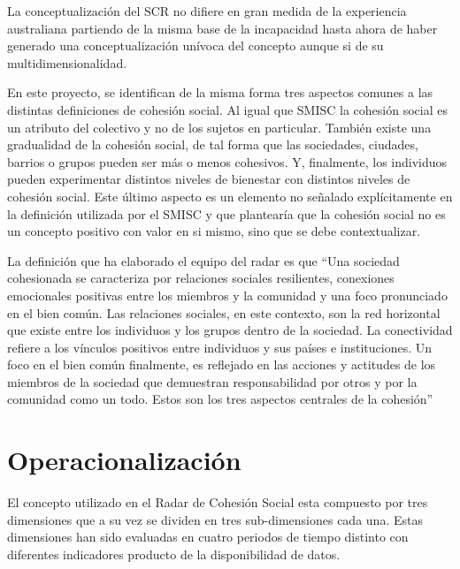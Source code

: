 \documentclass[
  12pt,
]{book}
\begin{document}
La conceptualización del SCR no difiere en gran medida de la experiencia
australiana partiendo de la misma base de la incapacidad hasta ahora de
haber generado una conceptualización unívoca del concepto aunque si de
su multidimensionalidad.

En este proyecto, se identifican de la misma forma tres aspectos comunes
a las distintas definiciones de cohesión social. Al igual que SMISC la
cohesión social es un atributo del colectivo y no de los sujetos en
particular. También existe una gradualidad de la cohesión social, de tal
forma que las sociedades, ciudades, barrios o grupos pueden ser más o
menos cohesivos. Y, finalmente, los individuos pueden experimentar
distintos niveles de bienestar con distintos niveles de cohesión social.
Este último aspecto es un elemento no señalado explícitamente en la
definición utilizada por el SMISC y que plantearía que la cohesión
social no es un concepto positivo con valor en si mismo, sino que se
debe contextualizar.

La definición que ha elaborado el equipo del radar es que ``Una sociedad
cohesionada se caracteriza por relaciones sociales resilientes,
conexiones emocionales positivas entre los miembros y la comunidad y una
foco pronunciado en el bien común. Las relaciones sociales, en este
contexto, son la red horizontal que existe entre los individuos y los
grupos dentro de la sociedad. La conectividad refiere a los vínculos
positivos entre individuos y sus países e instituciones. Un foco en el
bien común finalmente, es reflejado en las acciones y actitudes de los
miembros de la sociedad que demuestran responsabilidad por otros y por
la comunidad como un todo. Estos son los tres aspectos centrales de la
cohesión'' \citep{dragolov2013social, delhey_Happier_2016}

\hypertarget{operacionalizaciuxf3n}{%
\section{Operacionalización}\label{operacionalizaciuxf3n}}

El concepto utilizado en el Radar de Cohesión Social esta compuesto por
tres dimensiones que a su vez se dividen en tres sub-dimensiones cada una.
Estas dimensiones han sido evaluadas en cuatro periodos de tiempo
distinto con diferentes indicadores producto de la disponibilidad de
datos.
\end{document}
